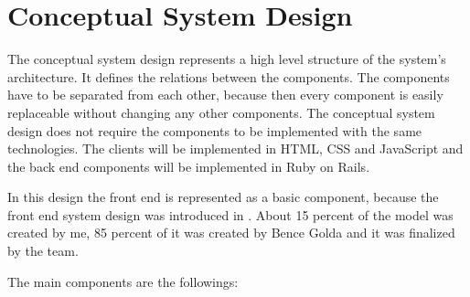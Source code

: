 \chapter{Conceptual System Design}\label{conceptual}
The conceptual system design represents a high level structure of the system's architecture. It defines the relations between the components. The components have to be separated from each other, because then every component is easily replaceable without changing any other components. The conceptual system design does not require the components to be implemented with the same technologies. The clients will be implemented in HTML, CSS and JavaScript  and the back end components will be implemented in Ruby on Rails.

In this design the front end is represented as a basic component, because the front end system design was introduced in . About 15 percent of the model was created by me, 85 percent of it was created by Bence Golda and it was finalized by the team.

The main components are the followings:

